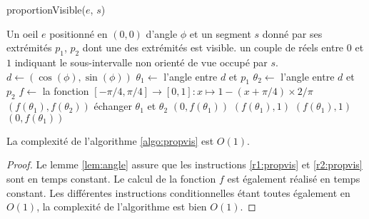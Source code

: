 \begin{algorithm}
  \caption{proportionVisible($e$, $s$)}
  \begin{algorithmic}[1] \label{algo:propvis}
    \REQUIRE Un oeil $e$ positionné en $(0, 0)$ d'angle $\phi$ et un segment $s$
    donné par ses extrémités $p_1$, $p_2$ dont une des extrémités est visible.
    \ENSURE un couple de réels entre $0$ et $1$  indiquant le sous-intervalle
    non orienté de vue occupé par $s$.
    \STATE $d\leftarrow (\cos(\phi), \sin(\phi))$
    \STATE $\theta_1\leftarrow$ l'angle entre $d$ et $p_1$ \label{r1:propvis}
    \STATE $\theta_2\leftarrow$ l'angle entre $d$ et $p_2$ \label{r2:propvis}
    \STATE $f\leftarrow$ la fonction $
    [-\pi/4, \pi/4]\to [0, 1]: x\mapsto 1 - (x+\pi/4) \times 2/\pi$
    \IF{$\theta_1\in[-\pi/4, \pi/4]\land \theta_2\in[-\pi/4, \pi/4]$}
    \RETURN $(f(\theta_1), f(\theta_2))$
    \ELSE
    \IF{$\theta_1\notin[-\pi/4, \pi/4]$}
    \STATE échanger $\theta_1$ et $\theta_2$
    \ENDIF
    \RETURN $(0, f(\theta_1))$
    \ELSE
    \RETURN $(f(\theta_1), 1)$
    \ENDIF
    \RETURN $(f(\theta_1), 1)$
    \ELSE
    \RETURN $(0, f(\theta_1))$
    \ENDIF
    \ENDIF
    \ENDIF
  \end{algorithmic}
\end{algorithm}

\begin{prop}
  La complexité de l'algorithme \ref{algo:propvis} est $O(1)$.
\end{prop}
\begin{proof}
  Le lemme \ref{lem:angle} assure que les instructions \ref{r1:propvis} et
  \ref{r2:propvis} sont en temps constant. Le calcul de la fonction $f$
  est également réalisé en temps constant. Les différentes instructions
  conditionnelles étant toutes également en $O(1)$, la complexité de
  l'algorithme est bien $O(1)$.
\end{proof}



